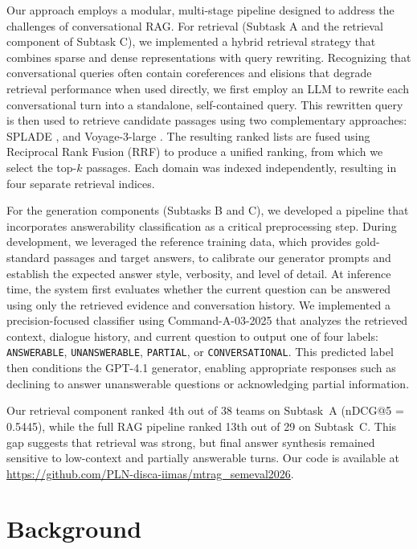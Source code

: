 \documentclass[11pt]{article}
\begin{document}
Our approach employs a modular, multi-stage pipeline designed to address the challenges of conversational RAG. For retrieval (Subtask A and the retrieval component of Subtask C), we implemented a hybrid retrieval strategy that combines sparse and dense representations with query rewriting. Recognizing that conversational queries often contain coreferences and elisions that degrade retrieval performance when used directly, we first employ an LLM to rewrite each conversational turn into a standalone, self-contained query. This rewritten query is then used to retrieve candidate passages using two complementary approaches: SPLADE \cite{formal2021spladesparselexicalexpansion}, and Voyage-3-large \cite{voyageai2025_voyage3large}. The resulting ranked lists are fused using Reciprocal Rank Fusion (RRF) to produce a unified ranking, from which we select the top-$k$ passages. Each domain was indexed independently, resulting in four separate retrieval indices.

For the generation components (Subtasks B and C), we developed a pipeline that incorporates answerability classification as a critical preprocessing step. 
During development, we leveraged the reference training data, which provides gold-standard passages and target answers, to calibrate our generator prompts and establish the expected answer style, verbosity, and level of detail. At inference time, the system first evaluates whether the current question can be answered using only the retrieved evidence and conversation history. We implemented a precision-focused classifier using Command-A-03-2025 \cite{cohere2025commanda} that analyzes the retrieved context, dialogue history, and current question to output one of four labels: \texttt{ANSWERABLE}, \texttt{UNANSWERABLE}, \texttt{PARTIAL}, or \texttt{CONVERSATIONAL}. This predicted label then conditions the GPT-4.1 \cite{openai2025gpt41} generator, enabling appropriate responses such as declining to answer unanswerable questions or acknowledging partial information.

Our retrieval component ranked 4th out of 38 teams on Subtask~A (nDCG@5 = 0.5445), while the full RAG pipeline ranked 13th out of 29 on Subtask~C. This gap suggests that retrieval was strong, but final answer synthesis remained sensitive to low-context and partially answerable turns. Our code is available at \url{https://github.com/PLN-disca-iimas/mtrag_semeval2026}.

\section{Background}
\end{document}

